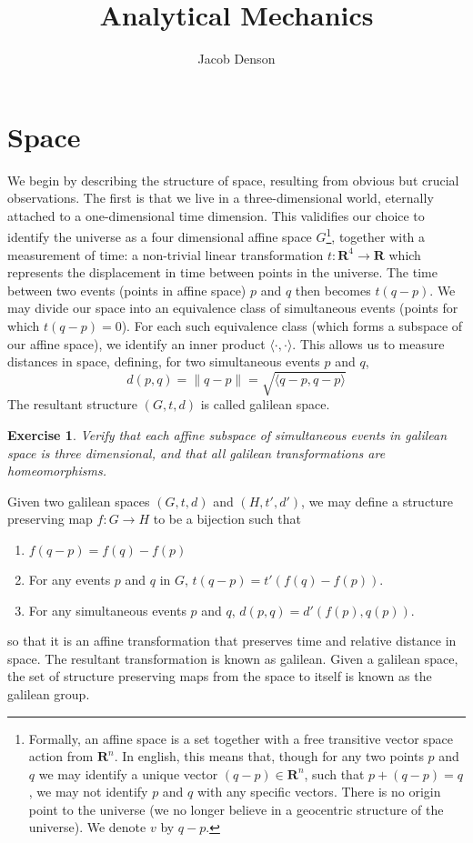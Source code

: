 \documentclass{article}
\title{Analytical Mechanics}
\author{Jacob Denson}
\newtheorem{exercise}{Exercise}
\begin{document}
\section{Space}

We begin by describing the structure of space, resulting from obvious but crucial observations. The first is that we live in a three-dimensional world, eternally attached to a one-dimensional time dimension. This validifies our choice to identify the universe as a four dimensional affine space $G$\footnote{Formally, an affine space is a set together with a free transitive vector space action from $\mathbf{R}^n$. In english, this means that, though for any two points $p$ and $q$ we may identify a unique vector $(q - p) \in \mathbf{R}^n$, such that $p + (q - p) = q$, we may not identify $p$ and $q$ with any specific vectors. There is no origin point to the universe (we no longer believe in a geocentric structure of the universe). We denote $v$ by $q - p$.}, together with a measurement of time: a non-trivial linear transformation $t:\mathbf{R}^4 \to \mathbf{R}$ which represents the displacement in time between points in the universe. The time between two events (points in affine space) $p$ and $q$ then becomes $t(q - p)$. We may divide our space into an equivalence class of simultaneous events (points for which $t(q - p) = 0$). For each such equivalence class (which forms a subspace of our affine space), we identify an inner product $\langle \cdot, \cdot \rangle$. This allows us to measure distances in space, defining, for two simultaneous events $p$ and $q$,
%
\[ d(p,q) = \| q - p \| = \sqrt{\langle q - p, q - p \rangle} \]
%
The resultant structure $(G,t,d)$ is called galilean space.

\begin{exercise} Verify that each affine subspace of simultaneous events in galilean space is three dimensional, and that all galilean transformations are homeomorphisms. \end{exercise}

Given two galilean spaces $(G,t,d)$ and $(H,t',d')$, we may define a structure preserving map $f:G \to H$ to be a bijection such that
%
\begin{enumerate}
    \item $f(q - p) = f(q) - f(p)$
    \item For any events $p$ and $q$ in $G$, $t(q - p) = t'(f(q) - f(p))$.
    \item For any simultaneous events $p$ and $q$, $d(p,q) = d'(f(p),q(p))$.
\end{enumerate}
%
so that it is an affine transformation that preserves time and relative distance in space. The resultant transformation is known as galilean. Given a galilean space, the set of structure preserving maps from the space to itself is known as the galilean group.
\end{document}
